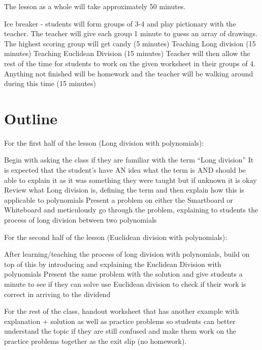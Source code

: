 The lesson as a whole will take approximately 50 minutes.
\begin{outline}
    \1 Ice breaker - students will form groups of 3-4 and play pictionary with the teacher. The teacher will give each group 1 minute to guess an array of drawings. The highest scoring group will get candy (5 minutes)
    \1 Teaching Long division (15 minutes)
    \1 Teaching Euclidean Division (15 minutes)
    \1 Teacher will then allow the rest of the time for students to work on the given worksheet in their groups of 4. Anything not finished will be homework and the teacher will be walking around during this time (15 minutes)
\end{outline}

\section{Outline}

For the first half of the lesson (Long division with polynomials):
\begin{outline}
    \1 Begin with asking the class if they are familiar with the term “Long division”
        \2 It is expected that the student’s have AN idea what the term is AND should be able to explain it as it was something they were taught but if unknown it is okay
    \1 Review what Long division is, defining the term and then explain how this is applicable to polynomials
    \1 Present a problem on either the Smartboard or Whiteboard and meticulously go through the problem, explaining to students the process of long division between two polynomials
\end{outline}

For the second half of the lesson (Euclidean division with polynomials):
\begin{outline}
    \1 After learning/teaching the process of long division with polynomials, build on top of this by introducing and explaining the Euclidean Division with polynomials
    \1 Present the same problem with the solution and give students a minute to see if they can solve use Euclidean division to check if their work is correct in arriving to the dividend
\end{outline}

For the rest of the class, handout worksheet that has another example with explanation + solution as well as practice problems so students can better understand the topic if they are still confused and make them work on the practice problems together as the exit slip (no homework).

